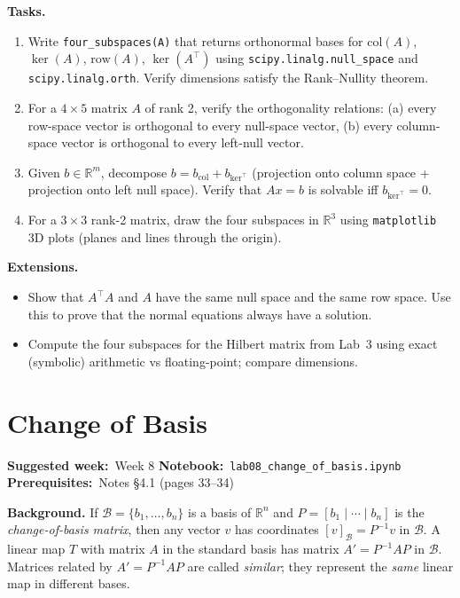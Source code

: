 \documentclass[11pt, a4paper]{article}
\newcommand{\labmeta}[3]{%
  \begin{prereqbox}
  \textbf{Suggested week:}~#1 \quad
  \textbf{Notebook:}~\texttt{#2} \quad
  \textbf{Prerequisites:}~#3
  \end{prereqbox}
  \vspace{4pt}
}
\newcommand{\tasks}[1]{%
  \begin{taskbox}
  \textbf{\color{taskcolor}Tasks.}
  \begin{enumerate}[leftmargin=1.6em, itemsep=3pt] #1 \end{enumerate}
  \end{taskbox}
}
\newcommand{\extensions}[1]{%
  \textbf{\color{notecolor}Extensions.}
  \begin{itemize}[leftmargin=1.6em, itemsep=1pt] #1 \end{itemize}
}
\begin{document}
\tasks{
  \item Write \texttt{four\_subspaces(A)} that returns orthonormal bases for
        $\mathrm{col}(A)$, $\ker(A)$, $\mathrm{row}(A)$, $\ker(A^\top)$ using
        \texttt{scipy.linalg.null\_space} and \texttt{scipy.linalg.orth}.
        Verify dimensions satisfy the Rank--Nullity theorem.
  \item For a $4 \times 5$ matrix $A$ of rank 2, verify the orthogonality
        relations:
        (a) every row-space vector is orthogonal to every null-space vector,
        (b) every column-space vector is orthogonal to every left-null vector.
  \item Given $b \in \mathbb{R}^m$, decompose $b = b_{\mathrm{col}} + b_{\ker^\top}$
        (projection onto column space + projection onto left null space).
        Verify that $Ax = b$ is solvable iff $b_{\ker^\top} = 0$.
  \item For a $3\times 3$ rank-2 matrix, draw the four subspaces in $\mathbb{R}^3$
        using \texttt{matplotlib} 3D plots (planes and lines through the origin).
}

\extensions{
  \item Show that $A^\top A$ and $A$ have the same null space and the same
        row space. Use this to prove that the normal equations always have a solution.
  \item Compute the four subspaces for the Hilbert matrix from Lab~3 using
        exact (symbolic) arithmetic vs floating-point; compare dimensions.
}

\section{Change of Basis}
\label{lab:cob}

\labmeta{Week 8}{lab08\_change\_of\_basis.ipynb}{Notes §4.1 (pages 33--34)}

\vspace{4pt}

\noindent\textbf{Background.}
If $\mathcal{B} = \{b_1,\ldots,b_n\}$ is a basis of $\mathbb{R}^n$ and
$P = [b_1 \mid \cdots \mid b_n]$ is the \emph{change-of-basis matrix}, then
any vector $v$ has coordinates $[v]_\mathcal{B} = P^{-1}v$ in $\mathcal{B}$.
A linear map $T$ with matrix $A$ in the standard basis has matrix
$A' = P^{-1}AP$ in $\mathcal{B}$.  Matrices related by $A' = P^{-1}AP$
are called \emph{similar}; they represent the \emph{same} linear map in
different bases.
\end{document}
